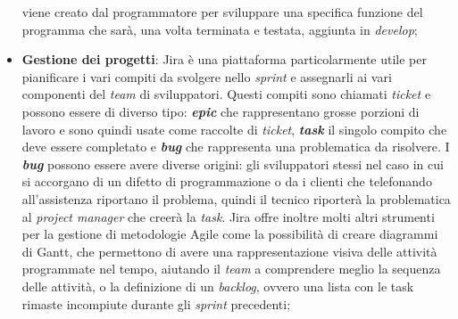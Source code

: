 \begin{itemize}
            viene creato dal programmatore per sviluppare una specifica funzione del programma che sarà, una volta 
            terminata e testata, aggiunta in \textit{develop};
      \item \textbf{Gestione dei progetti}: Jira è una piattaforma particolarmente utile per pianificare i vari 
            compiti da svolgere nello \textit{sprint} e assegnarli ai vari componenti del \textit{team} di sviluppatori. 
            Questi compiti sono chiamati \textit{ticket} e possono essere di diverso tipo: \textbf{\textit{epic}} che rappresentano 
            grosse porzioni di lavoro e sono quindi usate come raccolte di \textit{ticket}, \textbf{\textit{task}} il singolo 
            compito che deve essere completato e \textbf{\textit{bug}} che rappresenta una problematica da risolvere.
            I \textbf{\textit{bug}} possono essere avere diverse origini: gli sviluppatori stessi nel caso in cui si accorgano 
            di un difetto di programmazione o da i clienti che telefonando all'assistenza riportano il problema, 
            quindi il tecnico riporterà la problematica al \textit{project manager} che creerà la \textit{task}. Jira offre inoltre 
            molti altri strumenti per la gestione di metodologie Agile come la possibilità di creare diagrammi di Gantt, che 
            permettono di avere una rappresentazione visiva delle attività programmate nel tempo, aiutando il \textit{team} 
            a comprendere meglio la sequenza delle attività, o la definizione di un \textit{backlog}, ovvero una lista con le task 
            rimaste incompiute durante gli \textit{sprint} precedenti;
\end{itemize}